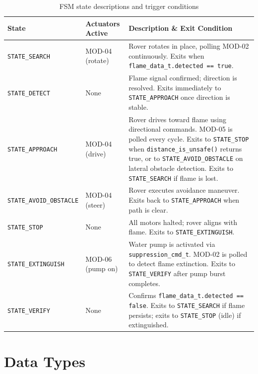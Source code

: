 \documentclass[12pt,a4paper]{article}
\begin{document}
\begin{table}[H]
\centering
\caption{FSM state descriptions and trigger conditions}
\begin{tabularx}{\linewidth}{llX}
    \toprule
    \textbf{State} & \textbf{Actuators Active} & \textbf{Description \& Exit Condition} \\
    \midrule
    \texttt{STATE\_SEARCH}
        & MOD-04 (rotate)
        & Rover rotates in place, polling MOD-02 continuously.
          Exits when \texttt{flame\_data\_t.detected == true}. \\[4pt]
    \texttt{STATE\_DETECT}
        & None
        & Flame signal confirmed; direction is resolved.
          Exits immediately to \texttt{STATE\_APPROACH} once direction is stable. \\[4pt]
    \texttt{STATE\_APPROACH}
        & MOD-04 (drive)
        & Rover drives toward flame using directional commands.
          MOD-05 is polled every cycle.
          Exits to \texttt{STATE\_STOP} when \texttt{distance\_is\_unsafe()} returns true,
          or to \texttt{STATE\_AVOID\_OBSTACLE} on lateral obstacle detection.
          Exits to \texttt{STATE\_SEARCH} if flame is lost. \\[4pt]
    \texttt{STATE\_AVOID\_OBSTACLE}
        & MOD-04 (steer)
        & Rover executes avoidance maneuver.
          Exits back to \texttt{STATE\_APPROACH} when path is clear. \\[4pt]
    \texttt{STATE\_STOP}
        & None
        & All motors halted; rover aligns with flame.
          Exits to \texttt{STATE\_EXTINGUISH}. \\[4pt]
    \texttt{STATE\_EXTINGUISH}
        & MOD-06 (pump on)
        & Water pump is activated via \texttt{suppression\_cmd\_t}.
          MOD-02 is polled to detect flame extinction.
          Exits to \texttt{STATE\_VERIFY} after pump burst completes. \\[4pt]
    \texttt{STATE\_VERIFY}
        & None
        & Confirms \texttt{flame\_data\_t.detected == false}.
          Exits to \texttt{STATE\_SEARCH} if flame persists;
          exits to \texttt{STATE\_STOP} (idle) if extinguished. \\
    \bottomrule
\end{tabularx}
\end{table}

\FloatBarrier
\section{Data Types}
\end{document}

